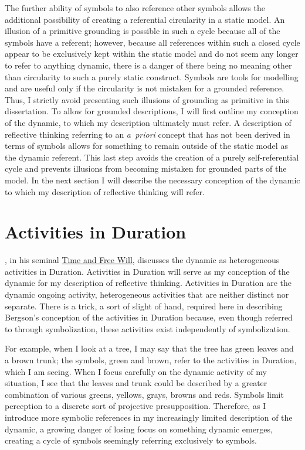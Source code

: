 The further ability of symbols to also reference other symbols allows
the additional possibility of creating a referential circularity in a
static model.  An illusion of a primitive grounding is possible in
such a cycle because all of the symbols have a referent; however,
because all references within such a closed cycle appear to be
exclusively kept within the static model and do not seem any longer to
refer to anything dynamic, there is a danger of there being no meaning
other than circularity to such a purely static construct.  Symbols are
tools for modelling and are useful only if the circularity is not
mistaken for a grounded reference.  Thus, I strictly avoid presenting
such illusions of grounding as primitive in this dissertation.  To
allow for grounded descriptions, I will first outline my conception of
the dynamic, to which my description ultimately must refer.  A
description of reflective thinking referring to an \emph{a~priori}
concept that has not been derived in terms of symbols allows for
something to remain outside of the static model as the dynamic
referent.  This last step avoids the creation of a purely
self-referential cycle and prevents illusions from becoming mistaken
for grounded parts of the model.  In the next section I will describe
the necessary conception of the dynamic to which my description of
reflective thinking will refer.

\section{Activities in Duration}

\cite{bergson:1910}, in his seminal \underline{Time and Free Will},
discusses the dynamic as heterogeneous activities in Duration.
Activities in Duration will serve as my conception of the dynamic for
my description of reflective thinking.  Activities in Duration are the
dynamic ongoing activity, heterogeneous activities that are neither
distinct nor separate.  There is a trick, a sort of slight of hand,
required here in describing Bergson's conception of the activities in
Duration because, even though referred to through symbolization, these
activities exist independently of symbolization.

For example, when I look at a tree, I may say that the tree has green
leaves and a brown trunk; the symbols, green and brown, refer to the
activities in Duration, which I am seeing.  When I focus carefully on
the dynamic activity of my situation, I see that the leaves and trunk
could be described by a greater combination of various greens,
yellows, grays, browns and reds.  Symbols limit perception to a
discrete sort of projective presupposition.  Therefore, as I introduce
more symbolic references in my increasingly limited description of the
dynamic, a growing danger of losing focus on something dynamic
emerges, creating a cycle of symbols seemingly referring exclusively
to symbols.

